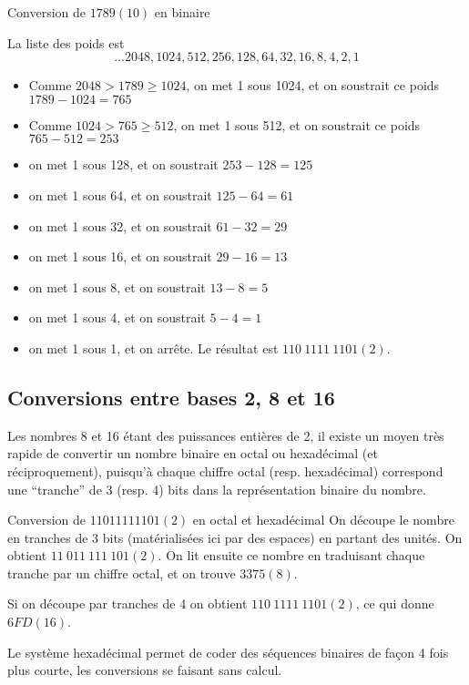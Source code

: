 \begin{exemple}{Conversion de $1789 (10)$ en binaire}
 
La liste des poids est
$$ \ldots 2048, 1024, 512, 256, 128, 64, 32, 16, 8, 4, 2, 1$$
\begin{itemize}
\item Comme $2048 > 1789 \geq 1024 $, on met 1 sous 1024, et on soustrait
ce poids $1789 -1024 = 765$
\item Comme $1024 > 765 \geq 512 $, on met 1 sous 512, et on soustrait
ce poids $765 - 512 = 253$
\item on met 1 sous 128, et on soustrait $253-128 = 125$
\item on met 1 sous 64, et on soustrait $125-64 = 61$
\item on met 1 sous 32, et on soustrait $61-32 = 29$
\item on met 1 sous 16, et on soustrait $29-16 = 13$
\item on met 1 sous 8, et on soustrait $13-8 = 5$
\item on met 1 sous 4, et on soustrait $5-4 = 1$
\item on met 1 sous 1, et on arr\^ete. Le r\'esultat est $110\ 1111\ 1101 (2)$.
\end{itemize}
\end{exemple}

\subsection{Conversions entre bases 2, 8 et 16}

Les nombres 8 et 16 \'etant des puissances enti\`eres de 2, 
il existe un moyen tr\`es rapide
de convertir un nombre binaire en octal ou hexad\'ecimal 
(et r\'eciproquement), puisqu'\`a
chaque chiffre octal (resp. hexad\'ecimal) correspond une ``tranche'' de
3 (resp. 4) bits dans la représentation binaire du nombre.

\begin{exemple}{Conversion de  $11011111101 (2)$ en octal et hexad\'ecimal}
On d\'ecoupe le nombre en tranches de 3 bits (mat\'erialis\'ees ici par
des espaces) en partant des unit\'es. On obtient $11\ 011\ 111\ 101 (2)$.
On lit  ensuite ce nombre en traduisant chaque tranche par un chiffre octal,
et on trouve
	$3375 (8)$.

Si on d\'ecoupe par tranches de 4 on obtient $110\ 1111\ 1101 (2)$, ce qui 
donne $6FD (16)$.
\end{exemple}

Le syst\`eme hexad\'ecimal permet de coder des séquences binaires
de façon  4 fois plus courte,  les conversions se faisant sans calcul.


